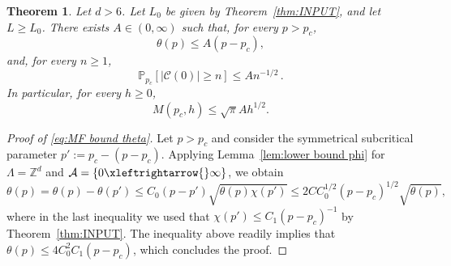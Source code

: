 \documentclass[11pt,a4paper]{article}
\numberwithin{equation}{section}
\theoremstyle{plain}
\newtheorem{Thm}{Theorem}[section]
\theoremstyle{definition}
\newcommand{\connect}{\xleftrightarrow}
\newcommand{\Z}{\mathbb{Z}}
\newcommand{\1}{\mathbf 1}
\begin{document}
{\begin{Thm}\label{thm:MF bounds theta} Let $d>6$. Let $L_0$ be given by Theorem~\textup{{\ref{thm:INPUT}}}, and let $L\geq L_0$.  There exists $A\in(0,\infty)$ such that, for every $p>p_c$,
	\begin{equation}\label{eq:MF bound theta}
		\theta(p)\leq A(p-p_c),
	\end{equation}
	and, for every $n\geq1$,
	\begin{equation}\label{eq:MF volume}
		\mathbb{P}_{p_c}[|\mathcal{C}(0)|\geq n]\leq An^{-1/2}\,.
	\end{equation}
	In particular, for every $h\geq 0$,
	\begin{equation}\label{eq:MF bound M}
		M(p_c,h)\leq \sqrt{\pi}Ah^{1/2}.
	\end{equation}
\end{Thm} 


\begin{proof}[Proof of \eqref{eq:MF bound theta}] 
	Let $p>p_c$ and consider the symmetrical subcritical parameter $p':=p_c - (p-p_c)$. Applying Lemma~\ref{lem:lower bound phi} for $\Lambda=\Z^d$ and $\mathcal{A}=\{0\connect{}\infty\}$, we obtain
	\begin{equation*}
		\theta(p) = \theta(p)-\theta(p')\leq C_0(p-p')\sqrt{\theta(p) \chi(p')} \leq 2C C_0^{1/2} (p-p_c)^{1/2} \sqrt{\theta(p)},
	\end{equation*}
	where in the last inequality we used that $\chi(p')\leq C_1 (p-p_c)^{-1}$ by Theorem~\ref{thm:INPUT}. 
	The inequality above readily implies that $\theta(p)\leq 4C_0^2 C_1 (p-p_c)$, which concludes the proof.
\end{proof}

}
\end{document}

